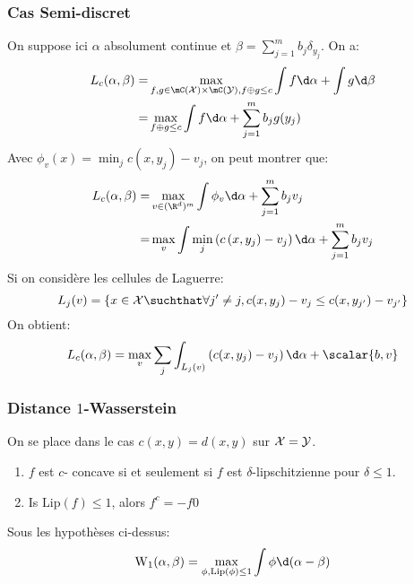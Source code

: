 \subsubsection{Cas Semi-discret}
On suppose ici $\alpha$ absolument continue et $\beta = \sum_{j = 1}^{m} b_{j} \delta_{y_{j}}$.
On a:
\begin{align*}
	L_{c}(\alpha, \beta) = & \max_{f, g \in \mC(\X) \times \mC(\Y), f\oplus g \leq c} \int f \d\alpha + \int g \d\beta \\
	=                      & \max_{f \oplus g \leq c} \int f\d \alpha + \sum_{j = 1}^{m}b_{j}g(y_{j})
\end{align*}
Avec $\phi_{v}(x) = \min_{j} c(x, y_{j}) - v_{j}$, on peut montrer que:
\begin{align*}
	L_{c}(\alpha, \beta) = & \max_{v \in (\R^{d})^{m}} \int \phi_{v} \d\alpha + \sum_{j= 1}^{m}b_{j}v_{j}                            \\
	=                      & \max_{v} \int \min_{j} \left(c\left(x, y_{j}\right)-v_{j}\right) \d \alpha + \sum_{j = 1}^{m}b_{j}v_{j}
\end{align*}
Si on considère les cellules de Laguerre:
\begin{equation*}
	L_{j}(v) = \left\{x \in \X \suchthat \forall j'\neq j, c(x, y_{j}) -v_{j} \leq c(x, y_{j'}) - v_{j'}\right\}
\end{equation*}
On obtient:
\begin{equation*}
	L_{c}(\alpha, \beta) = \max_{v} \sum_{j} \int_{L_{j}(v)} \left(c(x, y_{j}) - v_{j}\right) \d\alpha + \scalar{b, v}
\end{equation*}

\subsubsection{Distance $1$-Wasserstein}
On se place dans le cas $c(x, y) = d(x, y)$ sur $\mathcal{X} = \mathcal{Y}$.

\begin{proposition}
	\begin{enumerate}
		\item $f$ est $c$- concave si et seulement si $f$ est $\delta$-lipschitzienne pour $\delta \leq 1$.
		\item Is $\mathrm{Lip}(f) \leq 1$, alors $f^{c} = -f0$
	\end{enumerate}
\end{proposition}

\begin{proposition}
	Sous les hypothèses ci-dessus:
	\begin{equation*}
		\Wass_{1}(\alpha, \beta) = \max_{\phi, \mathrm{Lip}(\phi) \leq 1} \int \phi\d(\alpha - \beta)
	\end{equation*}
\end{proposition}


